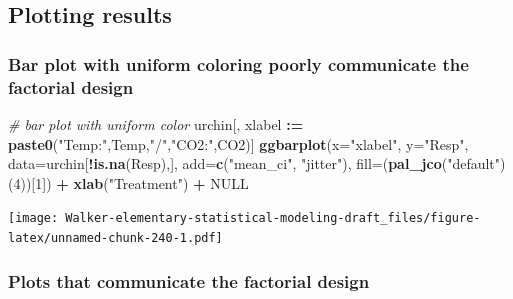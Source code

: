 \documentclass[]{book}
\newenvironment{Shaded}{\begin{snugshade}}{\end{snugshade}}
\newcommand{\CommentTok}[1]{\textcolor[rgb]{0.56,0.35,0.01}{\textit{#1}}}
\newcommand{\DataTypeTok}[1]{\textcolor[rgb]{0.13,0.29,0.53}{#1}}
\newcommand{\DecValTok}[1]{\textcolor[rgb]{0.00,0.00,0.81}{#1}}
\newcommand{\ErrorTok}[1]{\textcolor[rgb]{0.64,0.00,0.00}{\textbf{#1}}}
\newcommand{\KeywordTok}[1]{\textcolor[rgb]{0.13,0.29,0.53}{\textbf{#1}}}
\newcommand{\NormalTok}[1]{#1}
\newcommand{\OperatorTok}[1]{\textcolor[rgb]{0.81,0.36,0.00}{\textbf{#1}}}
\newcommand{\OtherTok}[1]{\textcolor[rgb]{0.56,0.35,0.01}{#1}}
\newcommand{\StringTok}[1]{\textcolor[rgb]{0.31,0.60,0.02}{#1}}
\begin{document}
\hypertarget{plotting-results}{%
\subsection{Plotting results}\label{plotting-results}}

\hypertarget{bar-plot-with-uniform-coloring-poorly-communicate-the-factorial-design}{%
\subsubsection{Bar plot with uniform coloring poorly communicate the factorial design}\label{bar-plot-with-uniform-coloring-poorly-communicate-the-factorial-design}}

\begin{Shaded}
\begin{Highlighting}[]
\CommentTok{# bar plot with uniform color}
\NormalTok{urchin[, xlabel }\OperatorTok{:}\ErrorTok{=}\StringTok{ }\KeywordTok{paste0}\NormalTok{(}\StringTok{"Temp:"}\NormalTok{,Temp,}\StringTok{"/"}\NormalTok{,}\StringTok{"CO2:"}\NormalTok{,CO2)]}
\KeywordTok{ggbarplot}\NormalTok{(}\DataTypeTok{x=}\StringTok{"xlabel"}\NormalTok{,}
          \DataTypeTok{y=}\StringTok{"Resp"}\NormalTok{,}
          \DataTypeTok{data=}\NormalTok{urchin[}\OperatorTok{!}\KeywordTok{is.na}\NormalTok{(Resp),],}
          \DataTypeTok{add=}\KeywordTok{c}\NormalTok{(}\StringTok{"mean_ci"}\NormalTok{, }\StringTok{"jitter"}\NormalTok{),}
          \DataTypeTok{fill=}\NormalTok{(}\KeywordTok{pal_jco}\NormalTok{(}\StringTok{"default"}\NormalTok{)(}\DecValTok{4}\NormalTok{))[}\DecValTok{1}\NormalTok{]) }\OperatorTok{+}
\StringTok{  }\KeywordTok{xlab}\NormalTok{(}\StringTok{"Treatment"}\NormalTok{) }\OperatorTok{+}
\StringTok{  }\OtherTok{NULL}
\end{Highlighting}
\end{Shaded}

\texttt{[image: Walker-elementary-statistical-modeling-draft\_files/figure-latex/unnamed-chunk-240-1.pdf]}

\hypertarget{plots-that-communicate-the-factorial-design}{%
\subsubsection{Plots that communicate the factorial design}\label{plots-that-communicate-the-factorial-design}}
\end{document}
